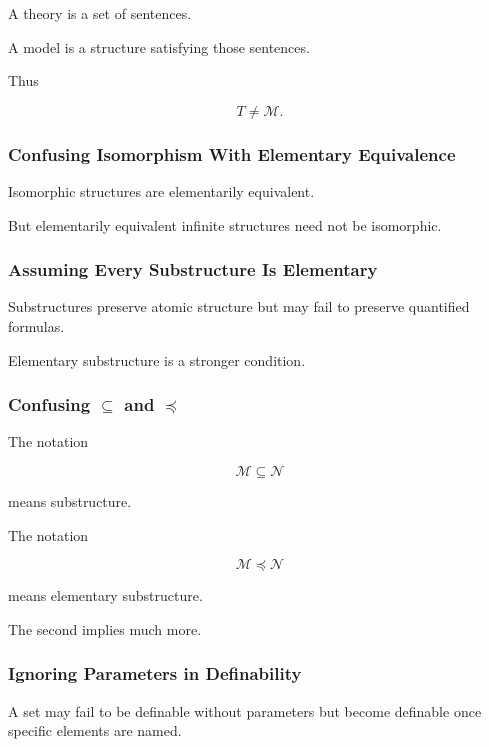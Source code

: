 A theory is a set of sentences.

A model is a structure satisfying those sentences.

Thus

\[
\boxed{
T
\neq
\mathcal{M}.
}
\]

\subsubsection{Confusing Isomorphism With Elementary Equivalence}

Isomorphic structures are elementarily equivalent.

But elementarily equivalent infinite structures need not be isomorphic.

\subsubsection{Assuming Every Substructure Is Elementary}

Substructures preserve atomic structure but may fail to preserve quantified
formulas.

Elementary substructure is a stronger condition.

\subsubsection{Confusing \(\subseteq\) and \(\preccurlyeq\)}

The notation

\[
\mathcal{M}\subseteq\mathcal{N}
\]

means substructure.

The notation

\[
\boxed{
\mathcal{M}\preccurlyeq\mathcal{N}
}
\]

means elementary substructure.

The second implies much more.

\subsubsection{Ignoring Parameters in Definability}

A set may fail to be definable without parameters but become definable once
specific elements are named.

